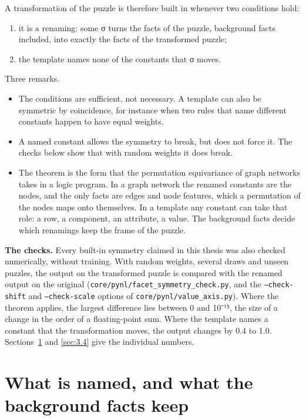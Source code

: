 A transformation of the puzzle is therefore built in whenever two conditions hold:

\begin{enumerate}
\item it is a renaming: some σ turns the facts of the puzzle, background facts included, into exactly the facts of the transformed puzzle;
\item the template names none of the constants that σ moves.
\end{enumerate}

Three remarks.

\begin{itemize}
\item The conditions are sufficient, not necessary. A template can also be symmetric by coincidence, for instance when two rules that name different constants happen to have equal weights.
\item A named constant allows the symmetry to break, but does not force it. The checks below show that with random weights it does break.
\item The theorem is the form that the permutation equivariance of graph networks takes in a logic program. In a graph network the renamed constants are the nodes, and the only facts are edges and node features, which a permutation of the nodes maps onto themselves. In a template any constant can take that role: a row, a component, an attribute, a value. The background facts decide which renamings keep the frame of the puzzle.
\end{itemize}

\textbf{The checks.} Every built-in symmetry claimed in this thesis was also checked numerically, without training. With random weights, several draws and unseen puzzles, the output on the transformed puzzle is compared with the renamed output on the original (\texttt{core/pynl/facet\_symmetry\_check.py}, and the \texttt{--check-shift} and \texttt{--check-scale} options of \texttt{core/pynl/value\_axis.py}). Where the theorem applies, the largest difference lies between 0 and 10⁻¹⁵, the size of a change in the order of a floating-point sum. Where the template names a constant that the transformation moves, the output changes by 0.4 to 1.0. Sections~\ref{sec:3.3} and \ref{sec:3.4} give the individual numbers.

\section{What is named, and what the background facts keep}\label{sec:3.3}

